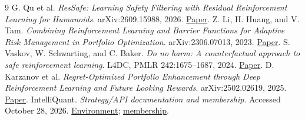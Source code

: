 \documentclass[10pt]{article}
\begin{document}
\begingroup
\small
\begin{thebibliography}{9}
\setlength{\itemsep}{1pt}
 G. Qu et al. \emph{ResSafe: Learning Safety Filtering with Residual Reinforcement Learning for Humanoids}. arXiv:2609.15988, 2026. \href{https://arxiv.org/abs/2609.15988}{Paper}.
 Z. Li, H. Huang, and V. Tam. \emph{Combining Reinforcement Learning and Barrier Functions for Adaptive Risk Management in Portfolio Optimization}. arXiv:2306.07013, 2023. \href{https://arxiv.org/abs/2306.07013}{Paper}.
 S. Vaskov, W. Schwarting, and C. Baker. \emph{Do no harm: A counterfactual approach to safe reinforcement learning}. L4DC, PMLR 242:1675--1687, 2024. \href{https://proceedings.mlr.press/v242/vaskov24a.html}{Paper}.
 D. Karzanov et al. \emph{Regret-Optimized Portfolio Enhancement through Deep Reinforcement Learning and Future Looking Rewards}. arXiv:2502.02619, 2025. \href{https://arxiv.org/abs/2502.02619}{Paper}.
 IntelliQuant. \emph{Strategy/API documentation and membership}. Accessed October 28, 2026. \href{https://www.intelliquant.ai/help/ref/15}{Environment}; \href{https://www.intelliquant.ai/membership}{membership}.
\end{thebibliography}
\endgroup
\end{document}
